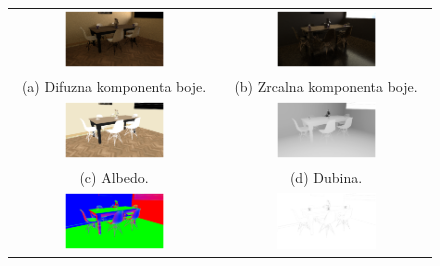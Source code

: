 \documentclass[times, utf8, seminar, numeric]{fer}
\begin{document}
\begin{figure}[H]
\begin{tabular}{cc}
  \includegraphics[width=0.5\textwidth]{noisy_diffuse.png} &   \includegraphics[width=0.5\textwidth]{noisy_specular.png} \\
(a) Difuzna komponenta boje. & (b) Zrcalna komponenta boje. \\[6pt]
 \includegraphics[width=0.5\textwidth]{noisy_albedo.png} &   \includegraphics[width=0.5\textwidth]{noisy_depth.png} \\
 (c) Albedo. & (d) Dubina. \\[6pt]
 \includegraphics[width=0.5\textwidth]{noisy_normals.png} &   \includegraphics[width=0.5\textwidth]{noisy_normalVariance.png} \\

\end{tabular}
\end{figure}
\end{document}
